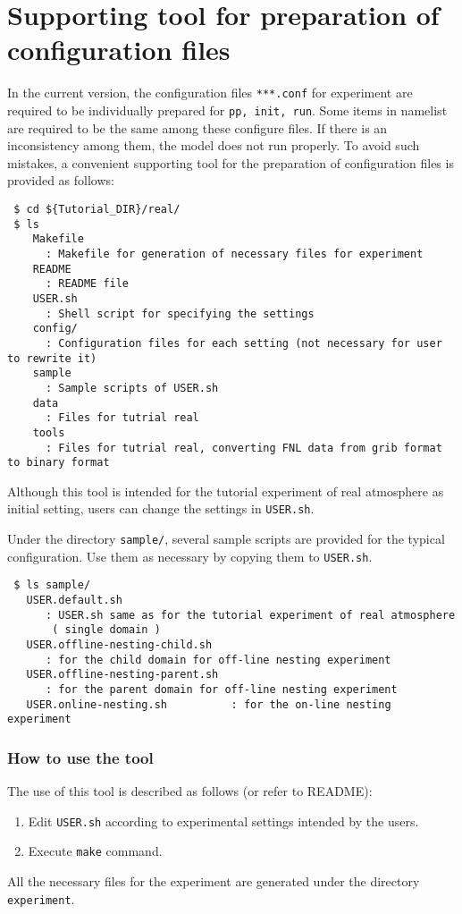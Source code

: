 \section{Supporting tool for preparation of configuration files} \label{sec:basic_makeconf}

In the current version, the configuration files \verb|***.conf| for experiment are required to be individually prepared for \verb|pp, init, run|. Some items in namelist are required to be the same among these configure files. If there is an inconsistency among them, the model does not run properly. To avoid such mistakes, a convenient supporting tool for the preparation of configuration files is provided as follows:
\begin{verbatim}
 $ cd ${Tutorial_DIR}/real/
 $ ls
    Makefile 
      : Makefile for generation of necessary files for experiment
    README
      : README file
    USER.sh
      : Shell script for specifying the settings
    config/  
      : Configuration files for each setting (not necessary for user to rewrite it)
    sample
      : Sample scripts of USER.sh
    data
      : Files for tutrial real
    tools
      : Files for tutrial real, converting FNL data from grib format to binary format
\end{verbatim}
Although this tool is intended for the tutorial experiment of real atmosphere as initial setting, users can change the settings in \verb|USER.sh|.

Under the directory \verb|sample/|, several sample scripts are provided for the typical configuration. Use them as necessary by copying them to \verb|USER.sh|.
\begin{verbatim}
 $ ls sample/
   USER.default.sh                 
      : USER.sh same as for the tutorial experiment of real atmosphere
       ( single domain )
   USER.offline-nesting-child.sh   
      : for the child domain for off-line nesting experiment
   USER.offline-nesting-parent.sh  
      : for the parent domain for off-line nesting experiment
   USER.online-nesting.sh          : for the on-line nesting experiment
\end{verbatim}


\subsubsection{How to use the tool}

The use of this tool is described as follows (or refer to README):
\begin{enumerate}
  \item Edit \verb|USER.sh| according to experimental settings intended by the users.
  \item Execute \verb|make| command.
\end{enumerate}
 All the necessary files for the experiment are generated under the directory \verb|experiment|.

